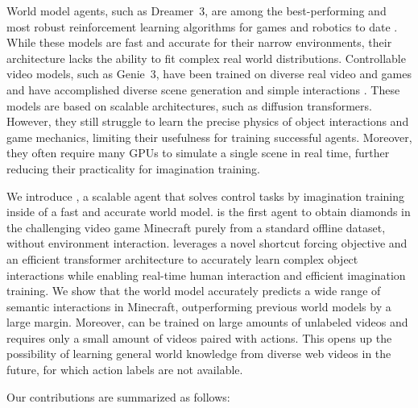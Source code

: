 \documentclass[11pt]{article}
\begin{document}
World model agents, such as Dreamer~3, are among the best-performing and most robust reinforcement learning algorithms for games and robotics to date \citep{dreamerv3,wu2023daydreamer,hansen2023tdtmpc2,alonso2024diffusion,schrittwieser2019muzero,hessel2021muesli}.
While these models are fast and accurate for their narrow environments, their architecture lacks the ability to fit complex real world distributions.
Controllable video models, such as Genie~3, have been trained on diverse real video and games and have accomplished diverse scene generation and simple interactions \citep{genie3,tu2025playerone,he2025matrix,sun2025virtual,bai2025whole,team2025yan}.
These models are based on scalable architectures, such as diffusion transformers\citep{peebles2023dit,diffusionforcing}.
However, they still struggle to learn the precise physics of object interactions and game mechanics, limiting their usefulness for training successful agents.
Moreover, they often require many GPUs to simulate a single scene in real time, further reducing their practicality for imagination training.

We introduce \method, a scalable agent that solves control tasks by imagination training inside of a fast and accurate world model.
\method is the first agent to obtain diamonds in the challenging video game Minecraft purely from a standard offline dataset, without environment interaction.
\method leverages a novel shortcut forcing objective and an efficient transformer architecture to accurately learn complex object interactions while enabling real-time human interaction and efficient imagination training.
We show that the world model accurately predicts a wide range of semantic interactions in Minecraft, outperforming previous world models by a large margin.
Moreover, \method can be trained on large amounts of unlabeled videos and requires only a small amount of videos paired with actions.
This opens up the possibility of learning general world knowledge from diverse web videos in the future, for which action labels are not available.

Our contributions are summarized as follows:
\end{document}

